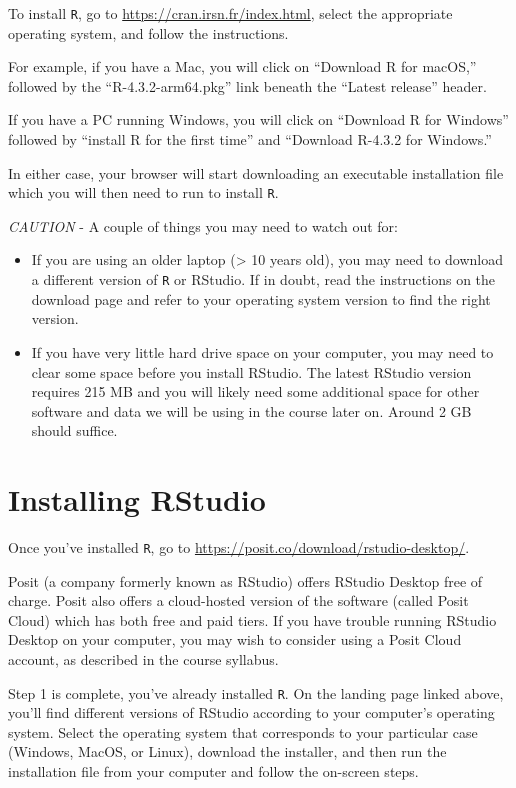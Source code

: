 \documentclass[
]{book}
\begin{document}
To install \texttt{R}, go to \url{https://cran.irsn.fr/index.html}, select the appropriate operating system, and follow the instructions.

For example, if you have a Mac, you will click on ``Download R for macOS,'' followed by the ``R-4.3.2-arm64.pkg'' link beneath the ``Latest release'' header.

If you have a PC running Windows, you will click on ``Download R for Windows'' followed by ``install R for the first time'' and ``Download R-4.3.2 for Windows.''

In either case, your browser will start downloading an executable installation file which you will then need to run to install \texttt{R}.

\emph{CAUTION} - A couple of things you may need to watch out for:

\begin{itemize}
\item
  If you are using an older laptop (\textgreater{} 10 years old), you may need to download a different version of \texttt{R} or RStudio. If in doubt, read the instructions on the download page and refer to your operating system version to find the right version.
\item
  If you have very little hard drive space on your computer, you may need to clear some space before you install RStudio. The latest RStudio version requires 215 MB and you will likely need some additional space for other software and data we will be using in the course later on. Around 2 GB should suffice.
\end{itemize}

\hypertarget{installing-rstudio}{%
\section{Installing RStudio}\label{installing-rstudio}}

Once you've installed \texttt{R}, go to \url{https://posit.co/download/rstudio-desktop/}.

Posit (a company formerly known as RStudio) offers RStudio Desktop free of charge. Posit also offers a cloud-hosted version of the software (called Posit Cloud) which has both free and paid tiers. If you have trouble running RStudio Desktop on your computer, you may wish to consider using a Posit Cloud account, as described in the course syllabus.

Step 1 is complete, you've already installed \texttt{R}. On the landing page linked above, you'll find different versions of RStudio according to your computer's operating system. Select the operating system that corresponds to your particular case (Windows, MacOS, or Linux), download the installer, and then run the installation file from your computer and follow the on-screen steps.
\end{document}
